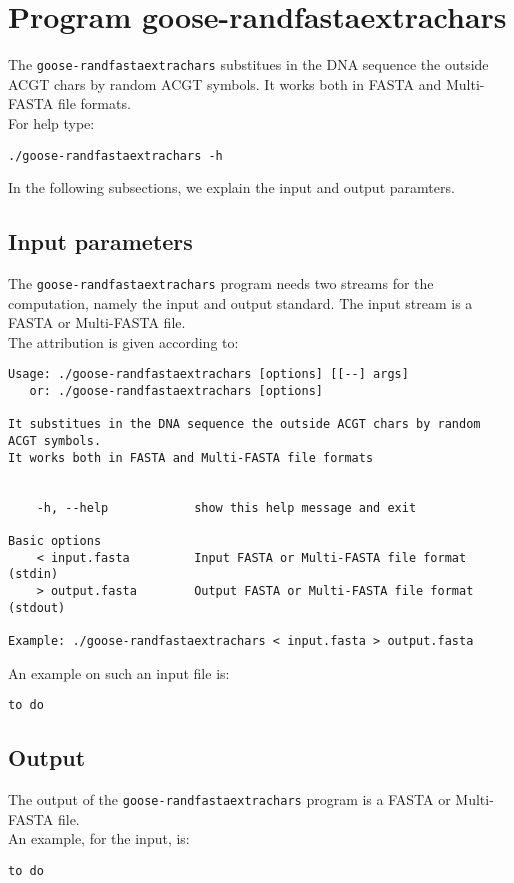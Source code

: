 \section{Program goose-randfastaextrachars}
The \texttt{goose-randfastaextrachars} substitues in the DNA sequence the outside ACGT chars by random ACGT symbols. It works both in FASTA and Multi-FASTA file formats.\\
For help type:
\begin{lstlisting}
./goose-randfastaextrachars -h
\end{lstlisting}
In the following subsections, we explain the input and output paramters.

\subsection*{Input parameters}

The \texttt{goose-randfastaextrachars} program needs two streams for the computation,
namely the input and output standard. The input stream is a FASTA or Multi-FASTA file.\\
The attribution is given according to:
\begin{lstlisting}
Usage: ./goose-randfastaextrachars [options] [[--] args]
   or: ./goose-randfastaextrachars [options]

It substitues in the DNA sequence the outside ACGT chars by random ACGT symbols.
It works both in FASTA and Multi-FASTA file formats


    -h, --help            show this help message and exit

Basic options
    < input.fasta         Input FASTA or Multi-FASTA file format (stdin)
    > output.fasta        Output FASTA or Multi-FASTA file format (stdout)

Example: ./goose-randfastaextrachars < input.fasta > output.fasta
\end{lstlisting}

An example on such an input file is:
\begin{lstlisting}
to do
\end{lstlisting}

\subsection*{Output}
The output of the \texttt{goose-randfastaextrachars} program is a FASTA or Multi-FASTA file.\\
An example, for the input, is:
\begin{lstlisting}
to do
\end{lstlisting}